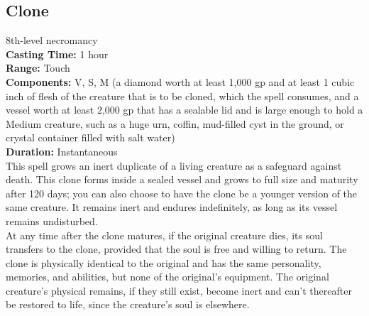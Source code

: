 \documentclass[11pt, A4paper, english]{article}
\begin{document}
		\subsection{Clone}
8th-level necromancy \\
\textbf{Casting Time:} 1 hour \\
\textbf{Range:} Touch \\
\textbf{Components:} V, S, M (a diamond worth at least 1,000 gp and at least 1 cubic inch of flesh of the creature that is to be cloned, which the spell consumes, and a vessel worth at least 2,000 gp that has a sealable lid and is large enough to hold a Medium creature, such as a huge urn, coffin, mud-filled cyst in the ground, or crystal container filled with salt water) \\
\textbf{Duration:} Instantaneous \\
This spell grows an inert duplicate of a living creature as a safeguard against death. This clone forms inside a sealed vessel and grows to full size and maturity after 120 days; you can also choose to have the clone be a younger version of the same creature. It remains inert and endures indefinitely, as long as its vessel remains undisturbed. \\
At any time after the clone matures, if the original creature dies, its soul transfers to the clone, provided that the soul is free and willing to return. The clone is physically identical to the original and has the same personality, memories, and abilities, but none of the original’s equipment. The original creature’s physical remains, if they still exist, become inert and can’t thereafter be restored to life, since the creature’s soul is elsewhere.
\end{document}
